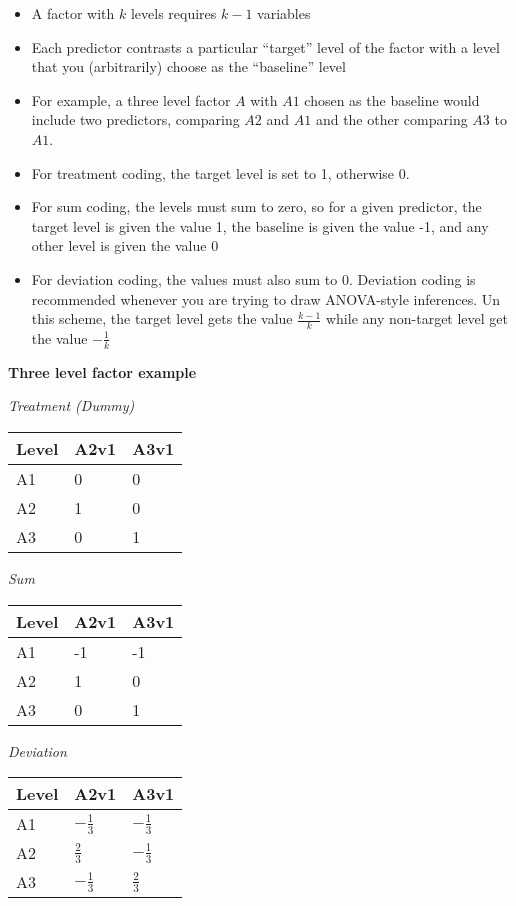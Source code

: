\documentclass[
]{article}
\providecommand{\tightlist}{%
  \setlength{\itemsep}{0pt}\setlength{\parskip}{0pt}}
\begin{document}
\begin{itemize}
\tightlist
\item
  A factor with \(k\) levels requires \(k-1\) variables
\item
  Each predictor contrasts a particular ``target'' level of the factor
  with a level that you (arbitrarily) choose as the ``baseline'' level
\item
  For example, a three level factor \(A\) with \(A1\) chosen as the
  baseline would include two predictors, comparing \(A2\) and \(A1\) and
  the other comparing \(A3\) to \(A1\).
\item
  For treatment coding, the target level is set to 1, otherwise 0.
\item
  For sum coding, the levels must sum to zero, so for a given predictor,
  the target level is given the value 1, the baseline is given the value
  -1, and any other level is given the value 0
\item
  For deviation coding, the values must also sum to 0. Deviation coding
  is recommended whenever you are trying to draw ANOVA-style inferences.
  Un this scheme, the target level gets the value \(\frac{k-1}{k}\)
  while any non-target level get the value \(-\frac{1}{k}\)
\end{itemize}

\textbf{Three level factor example}

\emph{Treatment (Dummy)}

\begin{longtable}[]{@{}lll@{}}
\toprule\noalign{}
Level & A2v1 & A3v1 \\
\midrule\noalign{}
\endhead
\bottomrule\noalign{}
\endlastfoot
A1 & 0 & 0 \\
A2 & 1 & 0 \\
A3 & 0 & 1 \\
\end{longtable}

\emph{Sum}

\begin{longtable}[]{@{}lll@{}}
\toprule\noalign{}
Level & A2v1 & A3v1 \\
\midrule\noalign{}
\endhead
\bottomrule\noalign{}
\endlastfoot
A1 & -1 & -1 \\
A2 & 1 & 0 \\
A3 & 0 & 1 \\
\end{longtable}

\emph{Deviation}

\begin{longtable}[]{@{}lll@{}}
\toprule\noalign{}
Level & A2v1 & A3v1 \\
\midrule\noalign{}
\endhead
\bottomrule\noalign{}
\endlastfoot
A1 & \(-\frac{1}{3}\) & \(-\frac{1}{3}\) \\
A2 & \(\frac{2}{3}\) & \(-\frac{1}{3}\) \\
A3 & \(-\frac{1}{3}\) & \(\frac{2}{3}\) \\
\end{longtable}
\end{document}
